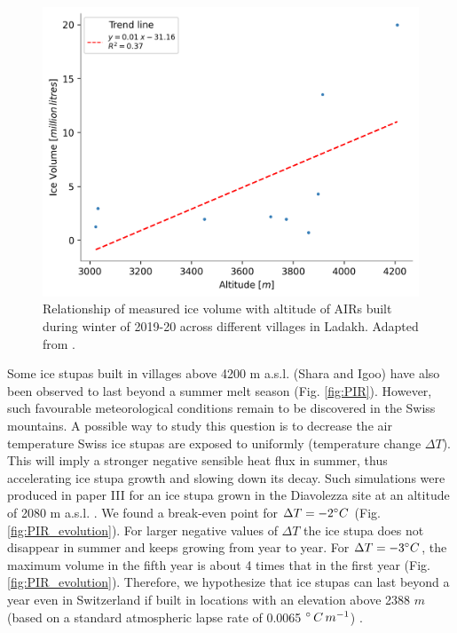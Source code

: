 \begin{figure}[htb]
\centering
\includegraphics[width=\textwidth]{figs/altitudevsvolume.png}
\caption{Relationship of measured ice volume with altitude of \ac{AIRs} built during winter of 2019-20 across
different villages in Ladakh. Adapted from \citet{mariagruberIceStupasLadakh2022}.}
\label{fig:altvsvol}
\end{figure}

Some ice stupas built in villages above 4200 m \ac{a.s.l.} (Shara and Igoo) have also been observed to last
beyond a summer melt season (Fig. \ref{fig:PIR}). However, such favourable meteorological conditions remain to
be discovered in the Swiss mountains. A possible way to study this question is to decrease the air temperature
Swiss ice stupas are exposed to uniformly (temperature change $\Delta T$). This will imply a stronger negative
sensible heat flux in summer, thus accelerating ice stupa growth and slowing down its decay. Such simulations
were produced in paper III for an ice stupa grown in the Diavolezza site at an altitude of 2080 m \ac{a.s.l.} .
We found a break-even point for $\Delta T = -2 ^{\circ} C$ (Fig. \ref{fig:PIR_evolution}). For larger negative
values of $\Delta T$ the ice stupa does not disappear in summer and keeps growing from year to year. For $\Delta
T = -3 ^{\circ} C$, the maximum volume in the fifth year is about 4 times that in the first year (Fig.
\ref{fig:PIR_evolution}). Therefore, we hypothesize that ice stupas can last beyond a year even in Switzerland
if built in locations with an elevation above 2388 $m$ (based on a standard atmospheric lapse rate of 0.0065
$^{\circ}\,C\,m^{-1}$) .

